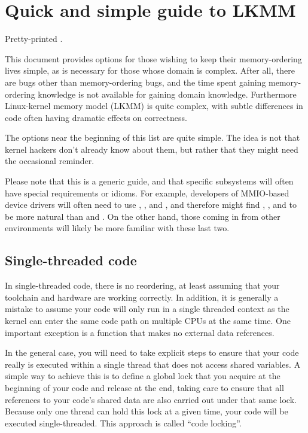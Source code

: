 \section{Quick and simple guide to LKMM}
\label{sec:docs:Quick and simple guide to LKMM}

\begin{Note}
  Pretty-printed .
\end{Note}

This document provides options for those wishing to keep their
memory-ordering lives simple, as is necessary for those whose domain
is complex.
After all, there are bugs other than memory-ordering bugs,
and the time spent gaining memory-ordering knowledge is not available
for gaining domain knowledge.
Furthermore Linux-kernel memory model (LKMM) is quite complex, with
subtle differences in code often having dramatic effects on correctness.

The options near the beginning of this list are quite simple.
The idea is not that kernel hackers don't already know about them,
but rather that they might need the occasional reminder.

Please note that this is a generic guide, and that specific subsystems
will often have special requirements or idioms.
For example, developers of MMIO-based device drivers will often need
to use , , and , and therefore might find
, , and 
to be more natural than  and .
On the other hand, those coming in from other environments will likely
be more familiar with these last two.


\subsection{Single-threaded code}

In single-threaded code, there is no reordering, at least assuming
that your toolchain and hardware are working correctly.
In addition, it is generally a mistake to assume your code will only
run in a single threaded context as the kernel can enter the same code
path on multiple CPUs at the same time.
One important exception is a function that makes no external data references.

In the general case, you will need to take explicit steps to ensure that
your code really is executed within a single thread that does not access
shared variables.
A simple way to achieve this is to define a global lock that you acquire
at the beginning of your code and release at the end, taking care to
ensure that all references to your code's shared data are also carried
out under that same lock.
Because only one thread can hold this lock at a given time, your code
will be executed single-threaded.
This approach is called ``code locking''.

